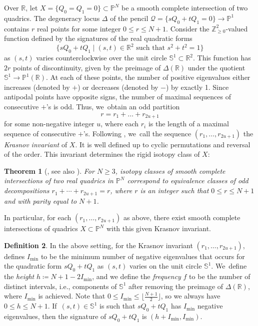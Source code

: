 \documentclass[JEP,XML,SOM,Unicode,NoEqCountersInSection,published]{cedram}
\let\cal\mathcal
\let\bb\mathbb\let\Bbb\mathbb
\theoremstyle{plain}
\newtheorem{thm}{Theorem}[section]
\theoremstyle{definition}
\newtheorem{defn}[thm]{Definition}
\newcommand{\defi}[1]{\emph{#1}}
\begin{document}
Over \(\bb R\), let \(X=\{Q_0 = Q_1 = 0\}\subset\bb P^N\) be a smooth complete intersection of two quadrics. The degeneracy locus \(\Delta\) of the pencil \(\cal Q = \{s Q_0 + t Q_1 = 0\} \to \bb P^1\) contains \(r\) real points for some integer \(0 \leq r \leq N+1\). Consider the \(\bb Z_{\geq 0}^2\)-valued function defined by the signatures of the real quadratic forms
\[
\{s Q_0 + t Q_1 \mid (s,t)\in\bb R^2 \text{ such that }s^2 + t^2 = 1\}
\]
as \((s,t)\) varies counterclockwise over the unit circle \(\bb S^1 \subset \bb R^2\). This function has \(2r\) points of discontinuity, given by the preimage of \(\Delta(\bb R)\) under the quotient \(\bb S^1 \to \bb P^1(\bb R)\). At each of these points, the number of positive eigenvalues either increases (denoted by \(+\)) or decreases (denoted by \(-\)) by exactly 1.
Since antipodal points have opposite signs, the number of maximal sequences of consecutive \(+\)'s is odd. Thus, we~obtain an odd partition
\[
r = r_1 + \dots + r_{2u+1}
\]
for some non-negative integer $u$,
where each \(r_i\) is the length of a maximal sequence of consecutive \(+\)'s. Following \cite{HassettKoll'arTschinkel}, we~call the sequence \((r_1,\ldots,r_{2u+1})\) the \defi{Krasnov invariant} of \(X\). It is well defined up to cyclic permutations and reversal of the order. This invariant determines the rigid isotopy class of \(X\):

\begin{thm}[{\cite[Th.\,1.1]{Krasnov-4-diml}, see also \cite[App.\,A.4.2]{DegtyarevItenbergKharlamov}}]\label{thm:krasnov-isotopy}
For \(N \geq 3\), isotopy classes of smooth complete intersections of two real quadrics in \(\bb P^N\) correspond to equivalence classes of odd decompositions \(r_1 + \cdots + r_{2u+1} = r\), where $r$ is an integer such that \(0\leq r\leq N+1\) and with parity equal to \(N+1\).
\end{thm}
In particular, for each \((r_1,\ldots,r_{2u+1})\) as above, there exist smooth complete intersections of quadrics \(X\subset\bb P^N\) with this given Krasnov invariant.

\begin{defn}\label{defn:krasnov-height-frequency}
In the above setting,
for the Krasnov invariant $(r_1,\dots, r_{2u+1})$,
\cite[\S 2]{krasnov-biquadrics} defines \(I_{\min}\) to be the minimum number of negative eigenvalues that occurs for the quadratic form \(s Q_0 + t Q_1\) as \((s,t)\) varies on the unit circle \(\bb S^1\). We~define the \defi{height} $h \coloneqq N+1- 2I_{\min}$, and
we define the \defi{frequency} $f$ to be the number of distinct intervals, i.e., components of \(\bb S^1\) after removing the preimage of \(\Delta(\bb R)\), where \(I_{\min}\) is achieved.
Note that \(0\leq I_{\min} \leq \lfloor\frac{N+1}{2}\rfloor\), so we always have \(0 \leq h\leq N+1\). If~\((s,t)\in\mathbb S^1\) is such that \(s Q_0 + t Q_1\) has \(I_{\min}\) negative eigenvalues, then the signature of \(s Q_0 + t Q_1\) is \((h+I_{\min}, I_{\min})\).
\end{defn}
\end{document}
